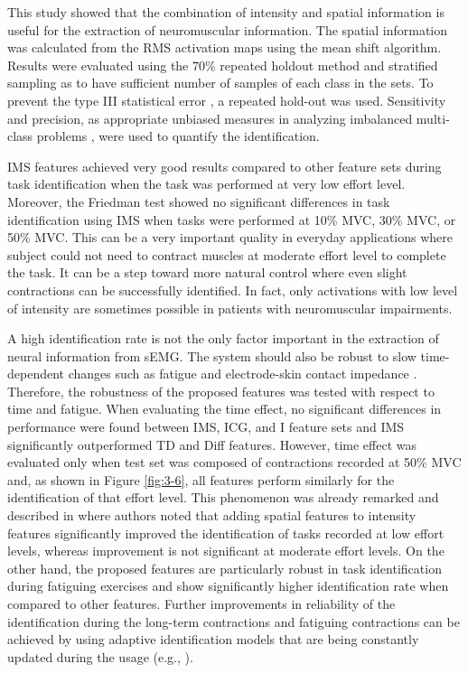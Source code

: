 
This study showed that the combination of intensity and spatial information is useful for the extraction of neuromuscular information. The spatial information was calculated from the RMS activation maps using the mean shift algorithm. Results were evaluated using the 70\% repeated holdout method and stratified sampling as to have sufficient number of samples of each class in the sets. To prevent the type III statistical error \citep{Mosteller1948, Mohebian2017}, a repeated hold-out was used. Sensitivity and precision, as appropriate unbiased measures in analyzing imbalanced multi-class problems \citep{Jordanic2016b, Rojas-Martinez2013}, were used to quantify the identification.

IMS features achieved very good results compared to other feature sets during task identification when the task was performed at very low effort level. Moreover, the Friedman test showed no significant differences in task identification using IMS when tasks were performed at 10\% MVC, 30\% MVC, or 50\% MVC. This can be a very important quality in everyday applications where subject could not need to contract muscles at moderate effort level to complete the task. It can be a step toward more natural control where even slight contractions can be successfully identified. In fact, only activations with low level of intensity are sometimes possible in patients with neuromuscular impairments.

A high identification rate is not the only factor important in the extraction of neural information from sEMG. The system should also be robust to slow time-dependent changes such as fatigue and electrode-skin contact impedance \citep{Farina2014}. Therefore, the robustness of the proposed features was tested with respect to time and fatigue. When evaluating the time effect, no significant differences in performance were found between IMS, ICG, and I feature sets and IMS significantly outperformed TD and Diff features. However, time effect was evaluated only when test set was composed of contractions recorded at 50\% MVC and, as shown in Figure \ref{fig:3-6}, all features perform similarly for the identification of that effort level. This phenomenon was already remarked and described in \citep{Jordanic2016a} where authors noted that adding spatial features to intensity features significantly improved the identification of tasks recorded at low effort levels, whereas improvement is not significant at moderate effort levels. On the other hand, the proposed features are particularly robust in task identification during fatiguing exercises and show significantly higher identification rate when compared to other features. Further improvements in reliability of the identification during the long-term contractions and fatiguing contractions can be achieved by using adaptive identification models that are being constantly updated during the usage (e.g., \citep{Vidovic2016, Hahne2015, Sensinger2009}).

